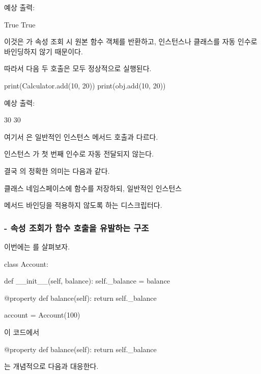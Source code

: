 예상 출력:

\begin{dhkzsh}
True
True
\end{dhkzsh}

이것은 가 속성 조회 시 원본 함수 객체를 반환하고, 인스턴스나 클래스를 자동 인수로 바인딩하지 않기 때문이다.

따라서 다음 두 호출은 모두 정상적으로 실행된다.

\begin{dhkcode}
print(Calculator.add(10, 20))
print(obj.add(10, 20))
\end{dhkcode}

예상 출력:

\begin{dhkzsh}
30
30
\end{dhkzsh}

여기서 은 일반적인 인스턴스 메서드 호출과 다르다.

인스턴스 가 첫 번째 인수로 자동 전달되지 않는다.

결국 의 정확한 의미는 다음과 같다.

\begin{dhksmry}[centered]
클래스 네임스페이스에 함수를 저장하되, 일반적인 인스턴스 

메서드 바인딩을 적용하지 않도록 하는 디스크립터다.
\end{dhksmry}

\subsubsection{ - 속성 조회가 함수 호출을 유발하는 구조}

이번에는 를 살펴보자.

\begin{dhkcode}
class Account:

    def __init__(self, balance):
        self._balance = balance

    @property
    def balance(self):
        return self._balance


account = Account(100)
\end{dhkcode}

이 코드에서

\begin{dhkcode}
@property
def balance(self):
    return self._balance
\end{dhkcode}

는 개념적으로 다음과 대응한다.

